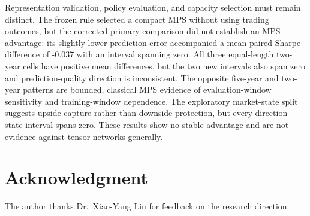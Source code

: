 \documentclass[conference]{IEEEtran}
\begin{document}
Representation validation, policy evaluation, and capacity selection must
remain distinct. The frozen rule selected a compact MPS without using trading
outcomes, but the corrected primary comparison did not establish an MPS
advantage: its slightly lower prediction error accompanied a mean paired
Sharpe difference of -0.037 with an interval spanning zero. All three
equal-length two-year cells have positive mean differences, but the two new
intervals also span zero and prediction-quality direction is inconsistent.
The opposite five-year and two-year patterns are bounded, classical MPS
evidence of evaluation-window sensitivity and training-window dependence.
The exploratory market-state split suggests upside capture rather than
downside protection, but every direction-state interval spans zero. These
results show no stable advantage and are not evidence against tensor networks
generally.

\section*{Acknowledgment}

The author thanks Dr.\ Xiao-Yang Liu for feedback on the research direction.



\end{document}
